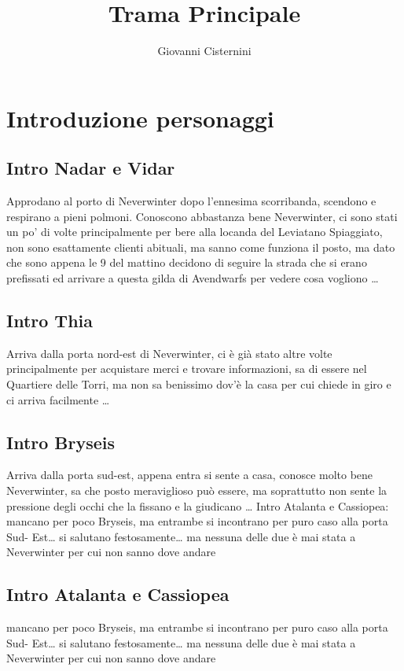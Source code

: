 \documentclass{article}
\title{Trama Principale}
\author{Giovanni Cisternini}
\begin{document}
\tableofcontents

\maketitle

\section{Introduzione personaggi}
    \subsection{Intro Nadar e Vidar}
    Approdano al porto di Neverwinter dopo l’ennesima scorribanda, scendono e respirano a pieni polmoni. Conoscono abbastanza bene Neverwinter, ci sono stati un po' di volte principalmente per bere alla locanda del Leviatano Spiaggiato, non sono esattamente clienti abituali, ma sanno come funziona il posto, ma dato che sono appena le 9 del mattino decidono di seguire la strada che si erano prefissati ed arrivare a questa gilda di Avendwarfs per vedere cosa vogliono …
    \subsection{Intro Thia}
    Arriva dalla porta nord-est di Neverwinter, ci è già stato altre volte principalmente per acquistare merci e trovare informazioni, sa di essere nel Quartiere delle Torri, ma non sa benissimo dov’è la casa per cui chiede in giro e ci arriva facilmente …
   
    \subsection{Intro Bryseis}
    Arriva dalla porta sud-est, appena entra si sente a casa, conosce molto bene Neverwinter, sa che posto meraviglioso può essere, ma soprattutto non sente la pressione degli occhi che la fissano e la giudicano …
    Intro Atalanta e Cassiopea: mancano per poco Bryseis, ma entrambe si incontrano per puro caso alla porta Sud- Est… si salutano festosamente… ma nessuna delle due è mai stata a Neverwinter per cui non sanno dove andare
    \subsection{Intro Atalanta e Cassiopea} mancano per poco Bryseis, ma entrambe si incontrano per puro caso alla porta Sud- Est… si salutano festosamente… ma nessuna delle due è mai stata a Neverwinter per cui non sanno dove andare
\end{document}
